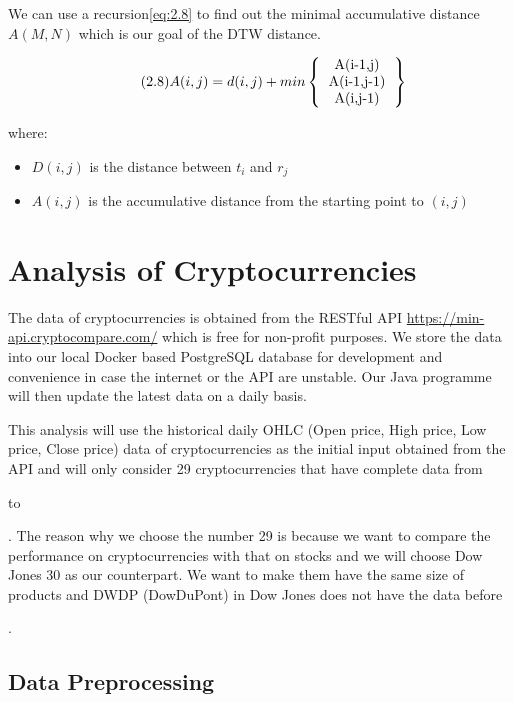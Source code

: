 \documentclass[11pt]{article} %
\theoremstyle{plain}
\theoremstyle{definition}
\begin{document}
We can use a recursion\eqref{eq:2.8} to find out the minimal accumulative distance $A(M,N)$ which is our goal of the DTW distance\cite{wiki/dtw:2018}.

{
    \begin{equation}
        \label{eq:2.8}
        \tag{2.8}
        {A(i,j) = d(i,j) + min
        \left \{
            \begin{tabular}{c}
                A(i-1,j) \\
                A(i-1,j-1) \\
                A(i,j-1)
            \end{tabular}
        \right \}}
    \end{equation}

    \footnotesize
    where:
    \begin{itemize}[label=-, leftmargin=4em, itemsep=0.1em]
        \item $D(i,j)$ is the distance between $t_i$ and $r_j$
        \item $A(i,j)$ is the accumulative distance from the starting point to $(i,j)$
    \end{itemize}
}

\section{Analysis of Cryptocurrencies}

The data of cryptocurrencies is obtained from the RESTful API \url{https://min-api.cryptocompare.com/}\cite{cryptocompare} which is free for non-profit purposes. We store the data into our local Docker based PostgreSQL database for development and convenience in case the internet or the API are unstable. Our Java programme will then update the latest data on a daily basis.

This analysis will use the historical daily OHLC (Open price, High price, Low price, Close price) data of cryptocurrencies as the initial input obtained from the API and will only consider 29 cryptocurrencies that have complete data from \date{1st January 2016} to \date{31st July 2018}. The reason why we choose the number 29 is because we want to compare the performance on cryptocurrencies with that on stocks and we will choose Dow Jones 30 as our counterpart. We want to make them have the same size of products and DWDP (DowDuPont) in Dow Jones does not have the data before \date{1st September 2017}.

\subsection{Data Preprocessing}
\end{document}
